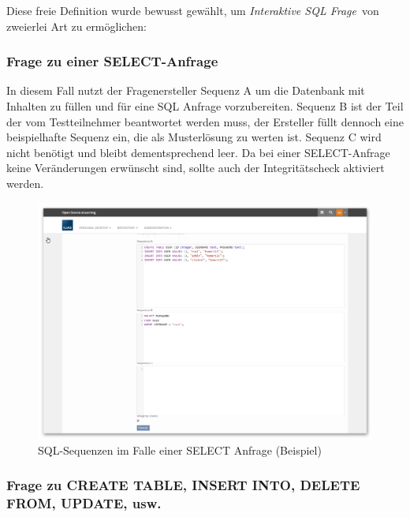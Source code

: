     Diese freie Definition wurde bewusst gewählt, um \glqq\textit{Interaktive SQL Frage}\grqq\ von zweierlei Art zu ermöglichen:
    
    \subsubsection{Frage zu einer SELECT-Anfrage}
    
        In diesem Fall nutzt der Fragenersteller Sequenz A um die Datenbank mit Inhalten zu füllen und für eine SQL Anfrage vorzubereiten. Sequenz B ist der Teil der vom Testteilnehmer beantwortet werden muss, der Ersteller füllt dennoch eine beispielhafte Sequenz ein, die als Musterlösung zu werten ist. Sequenz C wird nicht benötigt und bleibt dementsprechend leer. Da bei einer SELECT-Anfrage keine Veränderungen erwünscht sind, sollte auch der Integritätscheck aktiviert werden.
        
        \begin{figure}[H]
            \begin{center}
                \includegraphics[page=1, width=0.7\paperwidth, trim=4 4 4 4, clip]{fig/Beispiel-SQL-Sequenzen-bei-SELECT-Anfrage.png} 
                \caption{SQL-Sequenzen im Falle einer SELECT Anfrage (Beispiel)}
                \label{fig:beispiel-sql-sequenzen-bei-select-anfrage}
            \end{center}
        \end{figure}
        
    \subsubsection{Frage zu CREATE TABLE, INSERT INTO, DELETE FROM, UPDATE, usw.}
    

